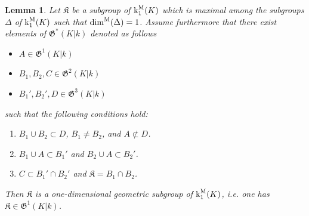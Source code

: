 \documentclass[11pt]{amsart}
\newtheorem{lemma}[proposition]{Lemma}
\theoremstyle{definition}
\theoremstyle{remark}
\numberwithin{equation}{section}
\newcommand{\Kfrak}{\mathfrak{K}}
\newcommand{\Gfrak}{\mathfrak{G}}
\renewcommand{\k}{\operatorname{k}^{\rm M}}
\newcommand{\dimm}{\dim^{\rm M}}
\begin{document}
\begin{lemma}
\label{lemma: mainproof / intersections / geometric-criterion}
  Let $\Kfrak$ be a subgroup of $\k_1(K)$ which is maximal among the subgroups $\Delta$ of $\k_1(K)$ such that $\dimm(\Delta) = 1$.
  Assume furthermore that there exist elements of $\Gfrak^*(K|k)$ denoted as follows
  \begin{itemize}
    \item $A \in \Gfrak^1(K|k)$
    \item $B_1,B_2,C \in \Gfrak^2(K|k)$
    \item $B_1',B_2',D \in \Gfrak^3(K|k)$
  \end{itemize}
  such that the following conditions hold:
  \begin{enumerate}
    \item $B_1 \cup B_2 \subset D$, $B_1 \neq B_2$, and $A \not\subset D$.
    \item $B_1 \cup A \subset B_1'$ and $B_2 \cup A \subset B_2'$.
    \item $C \subset B_1' \cap B_2'$ and $\Kfrak = B_1 \cap B_2$.
  \end{enumerate}
  Then $\Kfrak$ is a one-dimensional geometric subgroup of $\k_1(K)$, i.e. one has $\Kfrak \in \Gfrak^1(K|k)$.
\end{lemma}
\end{document}
